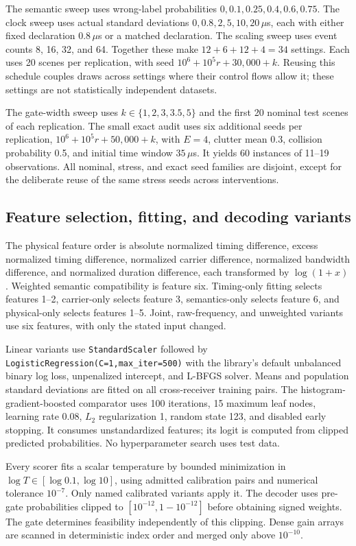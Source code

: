 \documentclass[10pt,a4paper]{article}
\begin{document}
The semantic sweep uses wrong-label probabilities $0,0.1,0.25,0.4,0.6,0.75$. The clock sweep uses actual standard deviations $0,0.8,2,5,10,20\,\mu$s, each with either fixed declaration $0.8\,\mu$s or a matched declaration. The scaling sweep uses event counts 8, 16, 32, and 64. Together these make $12+6+12+4=34$ settings. Each uses 20 scenes per replication, with seed $10^6+10^5r+30{,}000+k$. Reusing this schedule couples draws across settings where their control flows allow it; these settings are not statistically independent datasets.

The gate-width sweep uses $k\in\{1,2,3,3.5,5\}$ and the first 20 nominal test scenes of each replication. The small exact audit uses six additional seeds per replication, $10^6+10^5r+50{,}000+k$, with $E=4$, clutter mean 0.3, collision probability 0.5, and initial time window $35\,\mu$s. It yields 60 instances of 11--19 observations. All nominal, stress, and exact seed families are disjoint, except for the deliberate reuse of the same stress seeds across interventions.

\subsection{Feature selection, fitting, and decoding variants}
The physical feature order is absolute normalized timing difference, excess normalized timing difference, normalized carrier difference, normalized bandwidth difference, and normalized duration difference, each transformed by $\log(1+x)$. Weighted semantic compatibility is feature six. Timing-only fitting selects features 1--2, carrier-only selects feature 3, semantics-only selects feature 6, and physical-only selects features 1--5. Joint, raw-frequency, and unweighted variants use six features, with only the stated input changed.

Linear variants use \texttt{StandardScaler} followed by \texttt{LogisticRegression(C=1,max\_iter=500)} with the library's default unbalanced binary log loss, unpenalized intercept, and L-BFGS solver. Means and population standard deviations are fitted on all cross-receiver training pairs. The histogram-gradient-boosted comparator uses 100 iterations, 15 maximum leaf nodes, learning rate 0.08, $L_2$ regularization 1, random state 123, and disabled early stopping. It consumes unstandardized features; its logit is computed from clipped predicted probabilities. No hyperparameter search uses test data.

Every scorer fits a scalar temperature by bounded minimization in $\log T\in[\log0.1,\log10]$, using admitted calibration pairs and numerical tolerance $10^{-7}$. Only named calibrated variants apply it. The decoder uses pre-gate probabilities clipped to $[10^{-12},1-10^{-12}]$ before obtaining signed weights. The gate determines feasibility independently of this clipping. Dense gain arrays are scanned in deterministic index order and merged only above $10^{-10}$.
\end{document}

